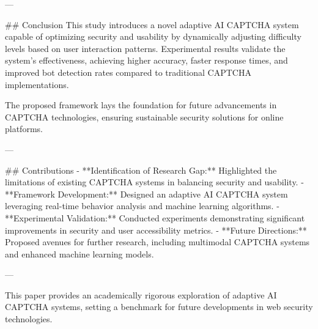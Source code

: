 ---

## Conclusion
This study introduces a novel adaptive AI CAPTCHA system capable of optimizing security and usability by dynamically adjusting difficulty levels based on user interaction patterns. Experimental results validate the system's effectiveness, achieving higher accuracy, faster response times, and improved bot detection rates compared to traditional CAPTCHA implementations. 

The proposed framework lays the foundation for future advancements in CAPTCHA technologies, ensuring sustainable security solutions for online platforms.

---

## Contributions
- **Identification of Research Gap:** Highlighted the limitations of existing CAPTCHA systems in balancing security and usability.
- **Framework Development:** Designed an adaptive AI CAPTCHA system leveraging real-time behavior analysis and machine learning algorithms.
- **Experimental Validation:** Conducted experiments demonstrating significant improvements in security and user accessibility metrics.
- **Future Directions:** Proposed avenues for further research, including multimodal CAPTCHA systems and enhanced machine learning models.

--- 

This paper provides an academically rigorous exploration of adaptive AI CAPTCHA systems, setting a benchmark for future developments in web security technologies.